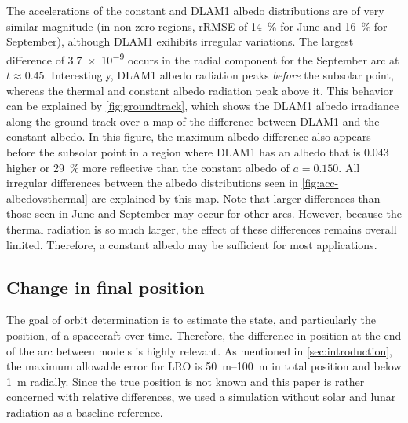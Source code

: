 The accelerations of the constant and \gls{DLAM1} albedo distributions are of very similar magnitude (in non-zero regions, rRMSE of \qty{14}{\percent} for June and \qty{16}{\percent} for September), although \gls{DLAM1} exihibits irregular variations. The largest difference of \qty{3.7e-9}{\acc} occurs in the radial component for the September arc at $t \approx \num{0.45}$. Interestingly, \gls{DLAM1} albedo radiation peaks \emph{before} the subsolar point, whereas the thermal and constant albedo radiation peak above it. This behavior can be explained by \cref{fig:groundtrack}, which shows the \gls{DLAM1} albedo irradiance along the ground track over a map of the difference between \gls{DLAM1} and the constant albedo. In this figure, the maximum albedo difference also appears before the subsolar point in a region where \gls{DLAM1} has an albedo that is \num{0.043} higher or \qty{29}{\percent} more reflective than the constant albedo of $a=0.150$. All irregular differences between the albedo distributions seen in \cref{fig:acc-albedovsthermal} are explained by this map. Note that larger differences than those seen in June and September may occur for other arcs. However, because the thermal radiation is so much larger, the effect of these differences remains overall limited. Therefore, a constant albedo may be sufficient for most applications.








\subsection{Change in final position}
The goal of orbit determination is to estimate the state, and particularly the position, of a spacecraft over time. Therefore, the difference in position at the end of the arc between models is highly relevant. As mentioned in \cref{sec:introduction}, the maximum allowable error for \gls{LRO} is \qtyrange{50}{100}{\m} in total position and below \qty{1}{\m} radially. Since the true position is not known and this paper is rather concerned with relative differences, we used a simulation without solar and lunar radiation as a baseline reference.

